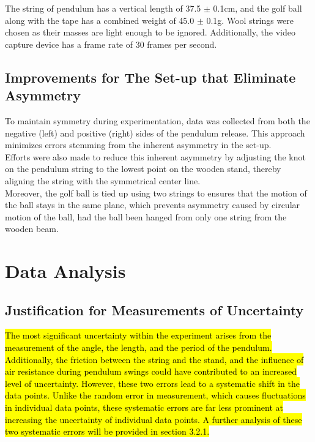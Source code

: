 \documentclass{article}
\begin{document}
 The string of pendulum has a vertical length of 37.5 $\pm$ 0.1cm, and the golf ball along with the tape has a combined weight of 45.0 $\pm$ 0.1g. Wool strings were chosen as their masses are light enough to be ignored. Additionally, the video capture device has a frame rate of 30 frames per second.

\subsection{Improvements for The Set-up that Eliminate Asymmetry}


To maintain symmetry during experimentation, data was collected from both the negative (left) and positive (right) sides of the pendulum release. This approach minimizes errors stemming from the inherent asymmetry in the set-up. \\
\indent Efforts were also made to reduce this inherent asymmetry by adjusting the knot on the pendulum string to the lowest point on the wooden stand, thereby aligning the string with the symmetrical center line. \\
\indent Moreover, the golf ball is tied up using two strings to ensures that the motion of the ball stays in the same plane, which prevents asymmetry caused by circular motion of the ball, had the ball been hanged from only one string from the wooden beam.

\section{Data Analysis}

\subsection{Justification for Measurements of Uncertainty}

\hl{The most significant uncertainty within the experiment arises from the measurement of the angle, the length, and the period of the pendulum. Additionally, the friction between the string and the stand, and the influence of air resistance during pendulum swings could have contributed to an increased level of uncertainty. However, these two errors lead to a systematic shift in the data points. Unlike the random error in measurement, which causes fluctuations in individual data points, these systematic errors are far less prominent at increasing the uncertainty of individual data points. A further analysis of these two systematic errors will be provided in section 3.2.1.}
\end{document}
